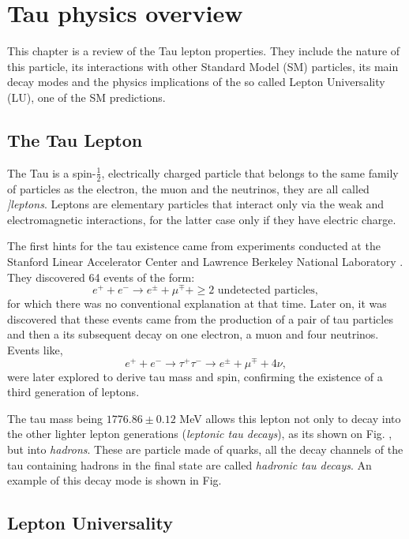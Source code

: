 \chapter{Tau physics overview}\label{chap:relatedwork}
This chapter is a review of the Tau lepton properties. They include the nature of this particle, its interactions with other Standard Model (SM) particles, its main decay modes and the physics implications of the so called Lepton Universality (LU), one of the SM predictions.  

\section{The Tau Lepton}
The Tau is a spin-$\frac{1}{2}$, electrically charged particle that belongs to the same family of particles as the electron, the muon and the neutrinos, they are all called \textit{]leptons}. Leptons are elementary particles that interact only via the weak and electromagnetic interactions, for the latter case only if they have electric charge.  

The first hints for the tau existence came from experiments conducted at the Stanford Linear Accelerator Center and Lawrence Berkeley National Laboratory \cite{PhysRevLett.35.1489}. They discovered 64 events of the form:
\begin{equation}
	e^+ + e^- \to e^\pm + \mu^\mp + \geq \text{2 undetected particles},
\end{equation}
for which there was no conventional explanation at that time. Later on, it was discovered that these events came from the production of a pair of tau particles and then a its subsequent decay on one electron, a muon and four neutrinos. Events like,
\begin{equation}
e^+ + e^- \to \tau^+ \tau^- \to e^\pm + \mu^\mp + 4\nu,
\end{equation}	
were later explored to derive tau mass and spin, confirming the existence of a third generation of leptons. 

The tau mass being $1776.86 \pm 0.12$ MeV allows this lepton not only to decay into the other lighter lepton generations (\textit{leptonic tau decays}), as its shown on Fig. , but into \textit{hadrons}. These are particle made of quarks, all the decay channels of the tau containing hadrons in the final state are called \textit{hadronic tau decays}. An example of this decay mode is shown in Fig. 

\section{Lepton Universality}



